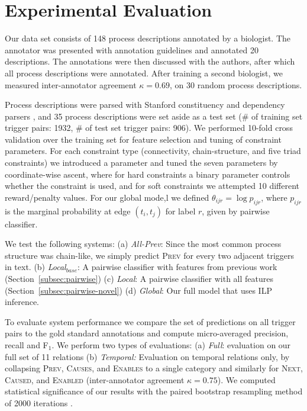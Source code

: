 \section{Experimental Evaluation} \label{subsec:setup}

Our data set consists of 148 process descriptions annotated by a biologist. The annotator was presented with annotation guidelines and annotated 20 descriptions. The annotations were then discussed with the authors, after which all process descriptions were annotated. After training a second biologist, we measured inter-annotator agreement $\kappa=0.69$, on 30 random process descriptions. 

Process descriptions were parsed with Stanford constituency and dependency parsers \cite{Klein03,Marneffe06}, and 35 process descriptions were set aside as a test set (\# of training set trigger pairs: 1932, \# of test set trigger pairs: 906). We performed 10-fold cross validation over the training set for feature selection and tuning of constraint parameters. For each constraint type (connectivity, chain-structure, and five triad constraints) we introduced a parameter and tuned the seven parameters by coordinate-wise ascent, where for hard constraints a binary parameter controls whether the constraint is used, and for soft constraints we attempted 10 different reward/penalty values. For our global mode,l we defined $\theta_{ijr}=\log p_{ijr}$, where $p_{ijr}$ is the marginal probability at edge $(t_i,t_j)$ for label $r$, given by pairwise classifier.


We test the following systems: (a) \emph{All-Prev}: Since the most common process structure was chain-like, we simply predict \textsc{Prev} for every two adjacent triggers in text. (b) \emph{Local$_{base}$}: A pairwise classifier with features from previous work (Section~\ref{subsec:pairwise}) (c) \emph{Local}: A pairwise classifier with all features (Section~\ref{subsec:pairwise-novel}) (d) \emph{Global}: Our full model that uses ILP inference.


To evaluate system performance we compare the set of predictions on all trigger pairs to the gold standard annotations and compute micro-averaged precision, recall and F$_1$. We perform two types of evaluations: (a) \emph{Full}: evaluation on our full set of 11 relations (b) \emph{Temporal:} Evaluation on temporal relations only, by collapsing \textsc{Prev}, \textsc{Causes}, and \textsc{Enables} to a single category and similarly for \textsc{Next}, \textsc{Caused}, and \textsc{Enabled} (inter-annotator agreement $\kappa=0.75$). We computed statistical significance of our results with the paired bootstrap resampling method of 2000 iterations \cite{efron1993}.

